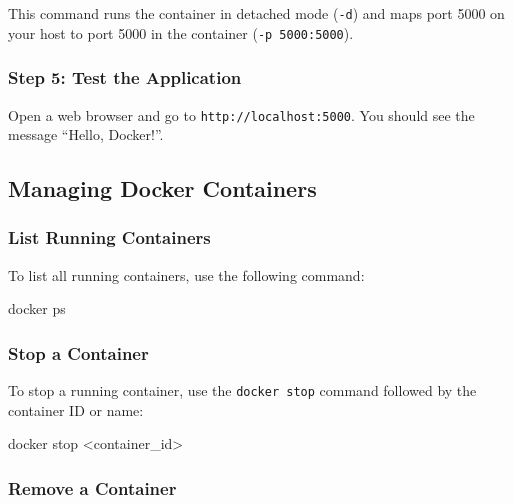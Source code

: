\documentclass[
  letterpaper,
  DIV=11,
  numbers=noendperiod]{scrreprt}
\newenvironment{Shaded}{\begin{snugshade}}{\end{snugshade}}
\newcommand{\ExtensionTok}[1]{\textcolor[rgb]{0.00,0.23,0.31}{#1}}
\newcommand{\NormalTok}[1]{\textcolor[rgb]{0.00,0.23,0.31}{#1}}
\newcommand{\OperatorTok}[1]{\textcolor[rgb]{0.37,0.37,0.37}{#1}}
\begin{document}
This command runs the container in detached mode (\texttt{-d}) and maps
port 5000 on your host to port 5000 in the container
(\texttt{-p\ 5000:5000}).

\subsubsection{Step 5: Test the
Application}\label{step-5-test-the-application-1}

Open a web browser and go to \texttt{http://localhost:5000}. You should
see the message ``Hello, Docker!''.

\subsection{Managing Docker
Containers}\label{managing-docker-containers-1}

\subsubsection{List Running Containers}\label{list-running-containers-1}

To list all running containers, use the following command:

\begin{Shaded}
\begin{Highlighting}[]
\ExtensionTok{docker}\NormalTok{ ps}
\end{Highlighting}
\end{Shaded}

\subsubsection{Stop a Container}\label{stop-a-container-1}

To stop a running container, use the \texttt{docker\ stop} command
followed by the container ID or name:

\begin{Shaded}
\begin{Highlighting}[]
\ExtensionTok{docker}\NormalTok{ stop }\OperatorTok{\textless{}}\NormalTok{container\_id}\OperatorTok{\textgreater{}}
\end{Highlighting}
\end{Shaded}

\subsubsection{Remove a Container}\label{remove-a-container-1}
\end{document}
